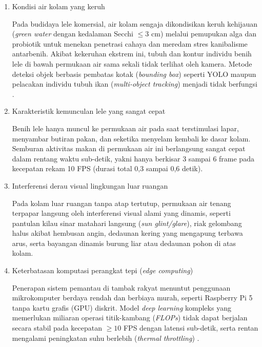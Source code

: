 \begin{enumerate}
    \item Kondisi air kolam yang keruh
    
    Pada budidaya lele komersial, air kolam sengaja dikondisikan keruh kehijauan (\textit{green water} dengan kedalaman Secchi $\le 3\text{ cm}$) melalui pemupukan alga dan probiotik untuk menekan penetrasi cahaya dan meredam stres kanibalisme antarbenih. Akibat kekeruhan ekstrem ini, tubuh dan kontur individu benih lele di bawah permukaan air sama sekali tidak terlihat oleh kamera. Metode deteksi objek berbasis pembatas kotak (\textit{bounding box}) seperti YOLO maupun pelacakan individu tubuh ikan (\textit{multi-object tracking}) menjadi tidak berfungsi \cite{Alahmad2025,Vijayalakshmi2025}.
    
    \item Karakteristik kemunculan lele yang sangat cepat
    
    Benih lele hanya muncul ke permukaan air pada saat terstimulasi lapar, menyambar butiran pakan, dan seketika menyelam kembali ke dasar kolam. Semburan aktivitas makan di permukaan air ini berlangsung sangat cepat dalam rentang waktu sub-detik, yakni hanya berkisar 3 sampai 6 frame pada kecepatan rekam 10 FPS (durasi total 0,3 sampai 0,6 detik).
    
    \item Interferensi derau visual lingkungan luar ruangan
    
    Pada kolam luar ruangan tanpa atap tertutup, permukaan air tenang terpapar langsung oleh interferensi visual alami yang dinamis, seperti pantulan kilau sinar matahari langsung (\textit{sun glint/glare}), riak gelombang halus akibat hembusan angin, dedaunan kering yang mengapung terbawa arus, serta bayangan dinamis burung liar atau dedaunan pohon di atas kolam.
    
    \item Keterbatasan komputasi perangkat tepi (\textit{edge computing})
    
    Penerapan sistem pemantau di tambak rakyat menuntut penggunaan mikrokomputer berdaya rendah dan berbiaya murah, seperti Raspberry Pi 5 tanpa kartu grafis (GPU) diskrit. Model \textit{deep learning} kompleks yang memerlukan miliaran operasi titik-kambang (\textit{FLOPs}) tidak dapat berjalan secara stabil pada kecepatan $\ge 10$ FPS dengan latensi sub-detik, serta rentan mengalami peningkatan suhu berlebih (\textit{thermal throttling}) \cite{Al-Abri2025}.
\end{enumerate}

